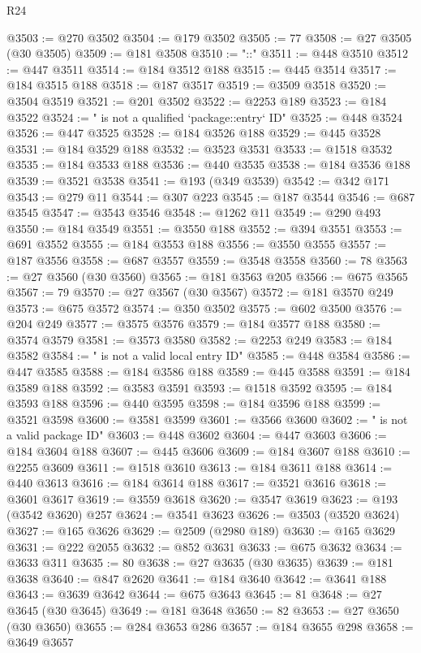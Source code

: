 \begin{lexlean}{R24}
\begin{coremodule}
@3503 := @270 @3502
@3504 := @179 @3502
@3505 := 77
@3508 := @27 @3505 (@30 @3505)
@3509 := @181 @3508
@3510 := "::"
@3511 := @448 @3510
@3512 := @447 @3511
@3514 := @184 @3512 @188
@3515 := @445 @3514
@3517 := @184 @3515 @188
@3518 := @187 @3517
@3519 := @3509 @3518
@3520 := @3504 @3519
@3521 := @201 @3502
@3522 := @2253 @189
@3523 := @184 @3522
@3524 := " is not a qualified `package::entry` ID"
@3525 := @448 @3524
@3526 := @447 @3525
@3528 := @184 @3526 @188
@3529 := @445 @3528
@3531 := @184 @3529 @188
@3532 := @3523 @3531
@3533 := @1518 @3532
@3535 := @184 @3533 @188
@3536 := @440 @3535
@3538 := @184 @3536 @188
@3539 := @3521 @3538
@3541 := @193 (@349 @3539)
@3542 := @342 @171
@3543 := @279 @11
@3544 := @307 @223
@3545 := @187 @3544
@3546 := @687 @3545
@3547 := @3543 @3546
@3548 := @1262 @11
@3549 := @290 @493
@3550 := @184 @3549
@3551 := @3550 @188
@3552 := @394 @3551
@3553 := @691 @3552
@3555 := @184 @3553 @188
@3556 := @3550 @3555
@3557 := @187 @3556
@3558 := @687 @3557
@3559 := @3548 @3558
@3560 := 78
@3563 := @27 @3560 (@30 @3560)
@3565 := @181 @3563 @205
@3566 := @675 @3565
@3567 := 79
@3570 := @27 @3567 (@30 @3567)
@3572 := @181 @3570 @249
@3573 := @675 @3572
@3574 := @350 @3502
@3575 := @602 @3500
@3576 := @204 @249
@3577 := @3575 @3576
@3579 := @184 @3577 @188
@3580 := @3574 @3579
@3581 := @3573 @3580
@3582 := @2253 @249
@3583 := @184 @3582
@3584 := " is not a valid local entry ID"
@3585 := @448 @3584
@3586 := @447 @3585
@3588 := @184 @3586 @188
@3589 := @445 @3588
@3591 := @184 @3589 @188
@3592 := @3583 @3591
@3593 := @1518 @3592
@3595 := @184 @3593 @188
@3596 := @440 @3595
@3598 := @184 @3596 @188
@3599 := @3521 @3598
@3600 := @3581 @3599
@3601 := @3566 @3600
@3602 := " is not a valid package ID"
@3603 := @448 @3602
@3604 := @447 @3603
@3606 := @184 @3604 @188
@3607 := @445 @3606
@3609 := @184 @3607 @188
@3610 := @2255 @3609
@3611 := @1518 @3610
@3613 := @184 @3611 @188
@3614 := @440 @3613
@3616 := @184 @3614 @188
@3617 := @3521 @3616
@3618 := @3601 @3617
@3619 := @3559 @3618
@3620 := @3547 @3619
@3623 := @193 (@3542 @3620) @257
@3624 := @3541 @3623
@3626 := @3503 (@3520 @3624)
@3627 := @165 @3626
@3629 := @2509 (@2980 @189)
@3630 := @165 @3629
@3631 := @222 @2055
@3632 := @852 @3631
@3633 := @675 @3632
@3634 := @3633 @311
@3635 := 80
@3638 := @27 @3635 (@30 @3635)
@3639 := @181 @3638
@3640 := @847 @2620
@3641 := @184 @3640
@3642 := @3641 @188
@3643 := @3639 @3642
@3644 := @675 @3643
@3645 := 81
@3648 := @27 @3645 (@30 @3645)
@3649 := @181 @3648
@3650 := 82
@3653 := @27 @3650 (@30 @3650)
@3655 := @284 @3653 @286
@3657 := @184 @3655 @298
@3658 := @3649 @3657

\end{coremodule}
\end{lexlean}
